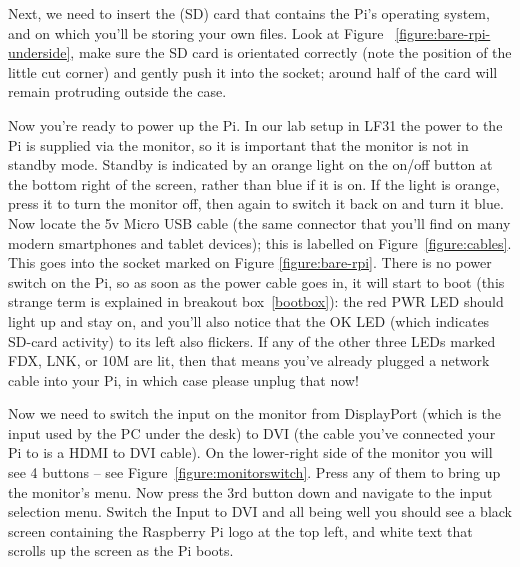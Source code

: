 Next, we need to insert the  (SD) card that contains the Pi's operating system, and on which you'll be storing your own files. Look at Figure ~\ref{figure:bare-rpi-underside}, make sure the SD card is orientated correctly (note the position of the little cut corner) and gently push it into the socket; around half of the card will remain protruding outside the case. 


Now you're ready to power up the Pi. In our lab setup in LF31 the power to the Pi is supplied via the monitor, so it is important that the monitor is not in standby mode. Standby is indicated by an orange light on the on/off button at the bottom right of the screen, rather than blue if it is on. If the light is orange, press it to turn the monitor off, then again to switch it back on and turn it blue. Now locate the 5v Micro USB cable (the same connector that you'll find on many modern smartphones and tablet devices); this is labelled \protect{} on Figure~\ref{figure:cables}. This goes into the socket marked  on Figure \ref{figure:bare-rpi}. There is no power switch on the Pi, so as soon as the power cable goes in, it will start to boot (this strange term is explained in breakout box~\ref{bootbox}): the red PWR LED should light up and stay on, and you'll also notice that the OK LED (which indicates SD-card activity) to its left also flickers. If any of the other three LEDs marked FDX, LNK, or 10M are lit, then that means you've already plugged a network cable into your Pi, in which case please unplug that now!




Now we need to switch the input on the monitor from DisplayPort (which
is the input used by the PC under the desk) to DVI (the cable you've
connected your Pi to is a HDMI to DVI cable). On the lower-right side
of the monitor you will see 4 buttons -- see
Figure~\ref{figure:monitorswitch}. Press any of them to bring up the
monitor's menu. Now press the 3rd button down and navigate to the
input selection menu. Switch the Input to DVI and all being well you
should see a black screen containing the Raspberry Pi logo at the top
left, and white text that scrolls up the screen as the Pi boots.

